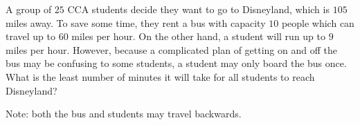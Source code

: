 A group of $25$ CCA students decide they want to go to Disneyland, which is $105$ miles away. To save some time, they rent a bus with capacity $10$ people which can travel up to $60$ miles per hour. On the other hand, a student will run up to $9$ miles per hour. However, because a complicated plan of getting on and off the bus may be confusing to some students, a student may only board the bus once. What is the least number of minutes it will take for all students to reach Disneyland?

Note: both the bus and students may travel backwards.
